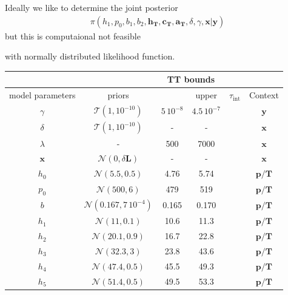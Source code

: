 Ideally we like to determine the joint posterior
\begin{align}
	\pi(h_1,p_0,b_1,b_2,\bm{h_T},\bm{c_T},\bm{a_T},\delta, \gamma, \bm{x}| \bm{y}) 
\end{align}
but this is computaional not feasible

with normally distributed likelihood function.

\begin{table}
	\centering
	\begin{tabular}{ |c||c|c|c|c|c|   }
		\hline
		& &\multicolumn{2}{|c|}{TT bounds}& &\\
		\hline
		model parameters& priors&\makecell{lower}& \makecell{upper\\
		}&$\tau_{\text{int}}$&Context\\
		\hhline{|=||=|=|=|=|=|}
		$\gamma$ & $\mathcal{T}(1,10^{-10})$ &$5 \, 10^{-8}$ &$4.5 \, 10^{-7}$& &$\bm{y}$\\ \hline
		$\delta$ &$\mathcal{T}(1,10^{-10})$ & -&-& & $\bm{x}$\\ \hline
		$\lambda$ &- & 500&7000& &$\bm{x}$\\ \hline
		$\bm{x}$ &$\mathcal{N}(0,\delta \bm{L})$ & -&-&& $\bm{x}$\\ \hhline{|=||=|=|=|=|=|}
		$h_0$ &  $\mathcal{N}(5.5,0.5)$& 4.76&5.74&&$\bm{p/T}$\\ \hline
		$p_0$ &  $\mathcal{N}(500,6)$&479 &519&&$\bm{p/T}$\\ \hline
		$b$ &  $\mathcal{N}(0.167,7\,10^{-4})$& 0.165& 0.170 &&$\bm{p/T}$\\ \hline
		$h_{1}$ &  $\mathcal{N}(11,0.1)$&10.6 &11.3&&$\bm{p/T}$\\ \hline
		$h_{2}$ &  $\mathcal{N}(20.1,0.9)$&16.7 &22.8&&$\bm{p/T}$\\ \hline
		$h_{3}$ &  $\mathcal{N}(32.3,3)$&23.8&43.6&&$\bm{p/T}$\\ \hline
		$h_{4}$ &  $\mathcal{N}(47.4,0.5)$&45.5 &49.3&&$\bm{p/T}$\\ \hline
		$h_{5}$ &  $\mathcal{N}(51.4,0.5)$&49.5 &53.3&&$\bm{p/T}$\\ \hline

\end{tabular}
\end{table}
